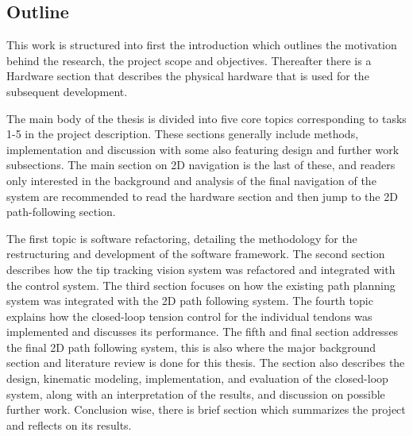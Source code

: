 \subsection{Outline}
This work is structured into first the introduction which outlines the motivation behind the research, the project scope and objectives. Thereafter there is a Hardware section that describes the physical hardware that is used for the subsequent development.

The main body of the thesis is divided into five core topics corresponding to tasks 1-5 in the project description. These sections generally include methods, implementation and discussion with some also featuring design and further work subsections. The main section on 2D navigation is the last of these, and readers only interested in the background and analysis of the final navigation of the system are recommended to read the hardware section and then jump to the 2D path-following section.

The first topic is software refactoring, detailing the methodology for the restructuring and development of the software framework. The second section describes how the tip tracking vision system was refactored and integrated with the control system. The third section focuses on how the existing path planning system was integrated with the 2D path following system. The fourth topic explains how the closed-loop tension control for the individual tendons was implemented and discusses its performance. The fifth and final section addresses the final 2D path following system, this is also where the major background section and literature review is done for this thesis. The section also describes the design, kinematic modeling, implementation, and evaluation of the closed-loop system, along with an interpretation of the results, and discussion on possible further work. Conclusion wise, there is brief section which summarizes the project and reflects on its results.


